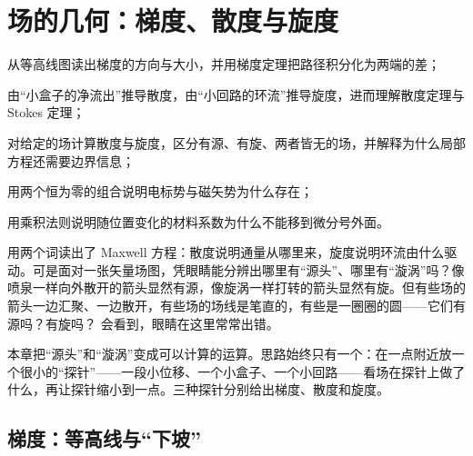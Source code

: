 \chapter{场的几何：梯度、散度与旋度}\label{ch:calculus}

\begin{chapterguide}
\begin{guidegoals}
\item 从等高线图读出梯度的方向与大小，并用梯度定理把路径积分化为两端的差；
\item 由“小盒子的净流出”推导散度，由“小回路的环流”推导旋度，进而理解散度定理与 Stokes 定理；
\item 对给定的场计算散度与旋度，区分有源、有旋、两者皆无的场，并解释为什么局部方程还需要边界信息；
\item 用两个恒为零的组合说明电标势与磁矢势为什么存在；
\item 用乘积法则说明随位置变化的材料系数为什么不能移到微分号外面。
\end{guidegoals}
\end{chapterguide}

 用两个词读出了 Maxwell 方程：散度说明通量从哪里来，旋度说明环流由什么驱动。可是面对一张矢量场图，凭眼睛能分辨出哪里有“源头”、哪里有“漩涡”吗？像喷泉一样向外散开的箭头显然有源，像旋涡一样打转的箭头显然有旋。但有些场的箭头一边汇聚、一边散开，有些场的场线是笔直的，有些是一圈圈的圆——它们有源吗？有旋吗？ 会看到，眼睛在这里常常出错。

本章把“源头”和“漩涡”变成可以计算的运算。思路始终只有一个：在一点附近放一个很小的“探针”——一段小位移、一个小盒子、一个小回路——看场在探针上做了什么，再让探针缩小到一点。三种探针分别给出梯度、散度和旋度。

\section{梯度：等高线与“下坡”}\label{sec:calc-grad}

